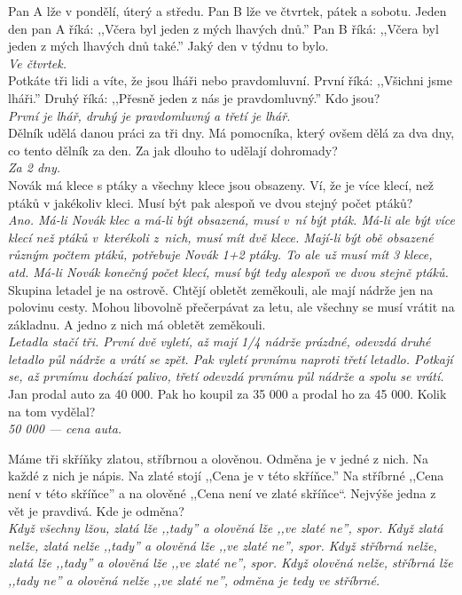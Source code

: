\begin{multicols}{2}
\noindent
Pan A lže v pondělí, úterý a středu. Pan B lže ve čtvrtek, 
pátek a sobotu. Jeden den pan A říká: ,,Včera byl jeden z mých 
lhavých dnů.'' Pan B říká: ,,Včera byl jeden z mých lhavých dnů 
také.'' Jaký den v týdnu to bylo.\\[1 mm]
{\sl Ve čtvrtek.}\\

\noindent
Potkáte tři lidi a víte, že jsou lháři nebo pravdomluvní. 
První říká: ,,Všichni jsme lháři.'' Druhý říká: ,,Přesně jeden z 
nás je pravdomluvný.'' Kdo jsou?\\[1 mm]
{\sl První je lhář, druhý je pravdomluvný a třetí je lhář.}\\

\noindent
Dělník udělá danou práci za tři dny. Má pomocníka, který 
ovšem dělá za dva dny, co tento dělník za den. Za jak dlouho 
to udělají dohromady?\\[1 mm]
{\sl Za 2 dny.}\\

\noindent
Novák má klece s ptáky a všechny klece jsou obsazeny. Ví, 
že je více klecí, než ptáků v jakékoliv kleci. Musí být pak alespoň 
ve dvou stejný počet ptáků?\\[1 mm]
{\sl Ano. Má-li Novák klec a má-li být obsazená, musí v~ní 
být pták. Má-li ale být více klecí než ptáků v~kterékoli 
z~nich, musí mít dvě klece. Mají-li být obě obsazené různým 
počtem ptáků, potřebuje Novák 1+2 ptáky. To ale už musí mít 3 
klece, atd. Má-li Novák konečný počet klecí, musí být tedy alespoň 
ve dvou stejně ptáků.}\\

\noindent
Skupina letadel je na ostrově. Chtějí obletět zeměkouli, 
ale mají nádrže jen na polovinu cesty. Mohou libovolně přečerpávat 
za letu, ale všechny se musí vrátit na základnu. A jedno z nich 
má obletět zeměkouli.\\[1 mm]
{\sl Letadla stačí tři. První dvě vyletí, až mají 1/4 nádrže prázdné, 
odevzdá druhé letadlo půl nádrže a vrátí se zpět. Pak vyletí 
prvnímu naproti třetí letadlo. Potkají se, až prvnímu dochází 
palivo, třetí odevzdá prvnímu půl nádrže a spolu se vrátí.}\\

\noindent
Jan prodal auto za 40 000. Pak ho koupil za 35 000 a prodal 
ho za 45 000. Kolik na tom vydělal?\\[1 mm]
{\sl 50 000 --- cena auta.}

\noindent
Máme tři skříňky zlatou, stříbrnou a olověnou. Odměna je 
v jedné z nich. Na každé z nich je nápis. Na zlaté stojí ,,Cena 
je v této skříňce.'' Na stříbrné ,,Cena není v této skříňce'' 
a na olověné ,,Cena není ve zlaté skříňce``. Nejvýše jedna z vět 
je pravdivá. Kde je odměna?\\[1 mm]
{\sl Když všechny lžou, zlatá lže ,,tady'' a olověná lže ,,ve zlaté 
ne'', spor. Když zlatá nelže, zlatá nelže ,,tady'' a olověná lže 
,,ve zlaté ne'', spor. Když stříbrná nelže, zlatá lže ,,tady'' 
a olověná lže ,,ve zlaté ne'', spor. Když olověná nelže, stříbrná 
lže ,,tady ne'' a olověná nelže ,,ve zlaté ne'', odměna je tedy 
ve stříbrné.}\\


\end{multicols}
